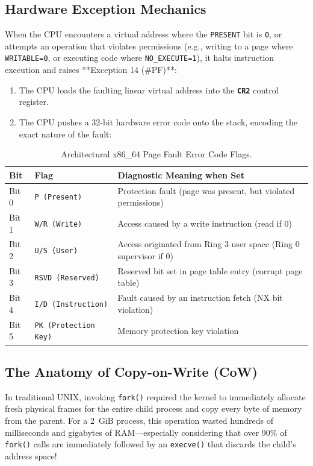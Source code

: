 \subsection{Hardware Exception Mechanics}
When the CPU encounters a virtual address where the \texttt{PRESENT} bit is \texttt{0}, or attempts an operation that violates permissions (e.g., writing to a page where \texttt{WRITABLE=0}, or executing code where \texttt{NO\_EXECUTE=1}), it halts instruction execution and raises **Exception 14 (\#PF)**:
\begin{enumerate}
    \item The CPU loads the faulting linear virtual address into the \textbf{\texttt{CR2}} control register.
    \item The CPU pushes a 32-bit hardware error code onto the stack, encoding the exact nature of the fault:
\end{enumerate}

\begin{table}[htbp]
\centering
\small
\begin{tabular}{lll}
\hline
\textbf{Bit} & \textbf{Flag} & \textbf{Diagnostic Meaning when Set} \\
\hline
Bit 0 & \texttt{P (Present)} & Protection fault (page was present, but violated permissions) \\
Bit 1 & \texttt{W/R (Write)} & Access caused by a write instruction (read if 0) \\
Bit 2 & \texttt{U/S (User)} & Access originated from Ring 3 user space (Ring 0 supervisor if 0) \\
Bit 3 & \texttt{RSVD (Reserved)} & Reserved bit set in page table entry (corrupt page table) \\
Bit 4 & \texttt{I/D (Instruction)} & Fault caused by an instruction fetch (NX bit violation) \\
Bit 5 & \texttt{PK (Protection Key)} & Memory protection key violation \\
\hline
\end{tabular}
\caption{Architectural x86\_64 Page Fault Error Code Flags.}
\label{tab:pf_flags}
\end{table}

\subsection{The Anatomy of Copy-on-Write (CoW)}
In traditional UNIX, invoking \texttt{fork()} required the kernel to immediately allocate fresh physical frames for the entire child process and copy every byte of memory from the parent. For a 2~GiB process, this operation wasted hundreds of milliseconds and gigabytes of RAM---especially considering that over 90\% of \texttt{fork()} calls are immediately followed by an \texttt{execve()} that discards the child's address space!

